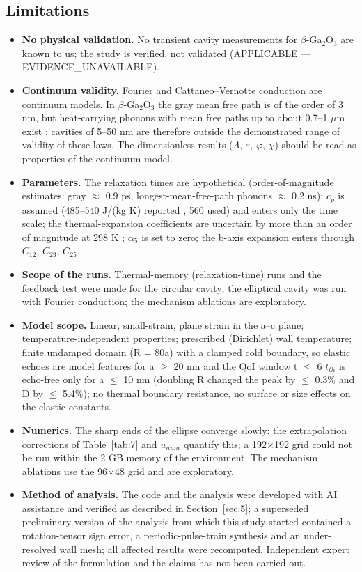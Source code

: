 \documentclass[preprint,12pt]{elsarticle}
\begin{document}
\subsection{Limitations}
\label{sec:7.2}

\begin{itemize}
\item \textbf{No physical validation.} No transient cavity measurements for $\beta$-Ga$_2$O$_3$ are known to us; the study is verified, not validated (APPLICABLE --- EVIDENCE\_UNAVAILABLE).
\item \textbf{Continuum validity.} Fourier and Cattaneo--Vernotte conduction are continuum models. In $\beta$-Ga$_2$O$_3$ the gray mean free path is of the order of 3 nm, but heat-carrying phonons with mean free paths up to about 0.7--1 $\mu$m exist \cite{yang2023}; cavities of 5--50 nm are therefore outside the demonstrated range of validity of these laws. The dimensionless results ($\Lambda$, $\varepsilon$, $\varphi$, $\chi$) should be read as properties of the continuum model.
\item \textbf{Parameters.} The relaxation times are hypothetical (order-of-magnitude estimates: gray $\approx$ 0.9 ps, longest-mean-free-path phonons $\approx$ 0.2 ns); $c_{p}$ is assumed (485--540 J/(kg K) reported \cite{handwerg2016}, 560 used) and enters only the time scale; the thermal-expansion coefficients are uncertain by more than an order of magnitude at 298 K \cite{orlandi2015,cheng2018}; $\alpha_{5}$ is set to zero; the b-axis expansion enters through $C_{12}$, $C_{23}$, $C_{25}$.
\item \textbf{Scope of the runs.} Thermal-memory (relaxation-time) runs and the feedback test were made for the circular cavity; the elliptical cavity was run with Fourier conduction; the mechanism ablations are exploratory.
\item \textbf{Model scope.} Linear, small-strain, plane strain in the a--c plane; temperature-independent properties; prescribed (Dirichlet) wall temperature; finite undamped domain (R = 80a) with a clamped cold boundary, so elastic echoes are model features for a $\geq$ 20 nm and the QoI window t $\leq$ 6 $t_{th}$ is echo-free only for a $\leq$ 10 nm (doubling R changed the peak by $\leq$ 0.3\% and D by $\leq$ 5.4\%); no thermal boundary resistance, no surface or size effects on the elastic constants.
\item \textbf{Numerics.} The sharp ends of the ellipse converge slowly: the extrapolation corrections of Table~\ref{tab:7} and $u_{num}$ quantify this; a 192$\times$192 grid could not be run within the 2 GB memory of the environment. The mechanism ablations use the 96$\times$48 grid and are exploratory.
\item \textbf{Method of analysis.} The code and the analysis were developed with AI assistance and verified as described in Section~\ref{sec:5}; a superseded preliminary version of the analysis from which this study started contained a rotation-tensor sign error, a periodic-pulse-train synthesis and an under-resolved wall mesh; all affected results were recomputed. Independent expert review of the formulation and the claims has not been carried out.
\end{itemize}
\end{document}
